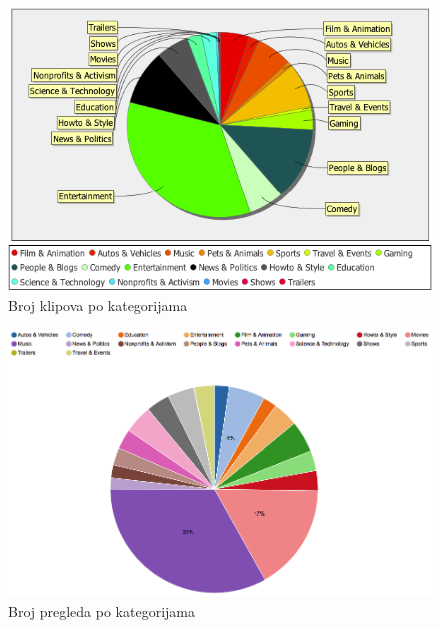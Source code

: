 \documentclass[a4paper]{article}
\theoremstyle{definition}
\begin{document}
\begin{figure}[H]
\begin{center}
    \includegraphics[width=1\textwidth]{categories_clips.png}
    \caption{Broj klipova po kategorijama}
    \label{fig:brojKlipova}
\end{center}
\end{figure}

\begin{figure}[H]
\begin{center}
    \includegraphics[width=1\textwidth]{categories_views.png}
    \caption{Broj pregleda po kategorijama}
    \label{fig:brojPregleda}
\end{center}
\end{figure}
\end{document}
